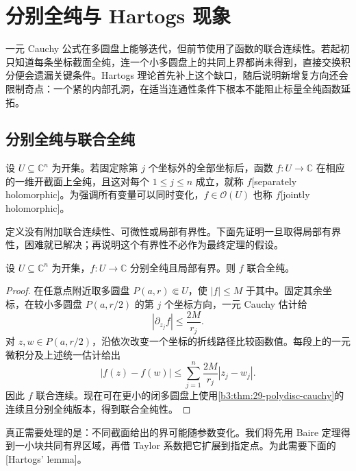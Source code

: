 \section{分别全纯与 Hartogs 现象}
\label{b3:sec:2902}

一元 Cauchy 公式在多圆盘上能够迭代，但前节使用了函数的联合连续性。若起初只知道每条坐标截面全纯，连一个小多圆盘上的共同上界都尚未得到，直接交换积分便会遗漏关键条件。Hartogs 理论首先补上这个缺口，随后说明新增复方向还会限制奇点：一个紧的内部孔洞，在适当连通性条件下根本不能阻止标量全纯函数延拓。

\subsection{分别全纯与联合全纯}
\label{b3:subsec:290201}

\begin{definition}\label{b3:def:29-separate-holomorphic}
设 \(U\subseteq\mathbb C^n\) 为开集。若固定除第 \(j\) 个坐标外的全部坐标后，函数 \(f:U\to\mathbb C\) 在相应的一维开截面上全纯，且这对每个 \(1\le j\le n\) 成立，就称 \(f\)[separately holomorphic]。为强调所有变量可以同时变化，\(f\in\mathcal O(U)\) 也称 \(f\)[jointly holomorphic]。
\end{definition}

定义没有附加联合连续性、可微性或局部有界性。下面先证明一旦取得局部有界性，困难就已解决；再说明这个有界性不必作为最终定理的假设。

\begin{lemma}\label{b3:lem:29-bounded-separate}
设 \(U\subseteq\mathbb C^n\) 为开集，\(f:U\to\mathbb C\) 分别全纯且局部有界。则 \(f\) 联合全纯。
\end{lemma}
\begin{proof}
在任意点附近取多圆盘 \(P(a,r)\Subset U\)，使 \(|f|\le M\) 于其中。固定其余坐标，在较小多圆盘 \(P(a,r/2)\) 的第 \(j\) 个坐标方向，一元 Cauchy 估计给
\[
 |\partial_{z_j}f|\le\frac{2M}{r_j}.
\]
对 \(z,w\in P(a,r/2)\)，沿依次改变一个坐标的折线路径比较函数值。每段上的一元微积分及上述统一估计给出
\[
 |f(z)-f(w)|\le\sum_{j=1}^n\frac{2M}{r_j}|z_j-w_j|.
\]
因此 \(f\) 联合连续。现在可在更小的闭多圆盘上使用\cref{b3:thm:29-polydisc-cauchy}的连续且分别全纯版本，得到联合全纯性。
\end{proof}

真正需要处理的是：不同截面给出的界可能随参数变化。我们将先用 Baire 定理得到一小块共同有界区域，再借 Taylor 系数把它扩展到指定点。为此需要下面的[Hartogs' lemma]。

